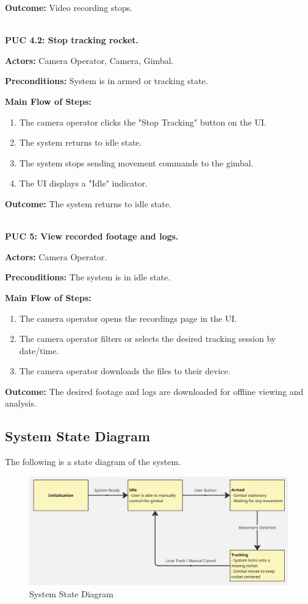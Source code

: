 \documentclass[12pt]{article}
\begin{document}
\textbf{Outcome:} Video recording stops.

~\\

\textbf{PUC 4.2: Stop tracking rocket.}

\textbf{Actors:} Camera Operator, Camera, Gimbal.

\textbf{Preconditions:} System is in armed or tracking state.

\textbf{Main Flow of Steps:}
\begin{enumerate}
  \item The camera operator clicks the "Stop Tracking" button on the UI.
  \item The system returns to idle state.
  \item The system stops sending movement commands to the gimbal.
  \item The UI displays a "Idle" indicator.
\end{enumerate}

\textbf{Outcome:} The system returns to idle state.

~\\

\textbf{PUC 5: View recorded footage and logs.}

\textbf{Actors:} Camera Operator.

\textbf{Preconditions:} The system is in idle state.

\textbf{Main Flow of Steps:}
\begin{enumerate}
  \item The camera operator opens the recordings page in the UI.
  \item The camera operator filters or selects the desired tracking session by
        date/time.
  \item The camera operator downloads the files to their device.
\end{enumerate}

\textbf{Outcome:} The desired footage and logs are downloaded for offline viewing and analysis.

\subsection{System State Diagram}

The following is a state diagram of the system.

\FloatBarrier
\begin{figure}[h]
  \centering
  \includegraphics[width=\textwidth,height=\textheight,keepaspectratio]{../Images/state_diagram.png}
  \caption{System State Diagram}
  \label{img:state-diagram}
\end{figure}
\FloatBarrier
\end{document}

